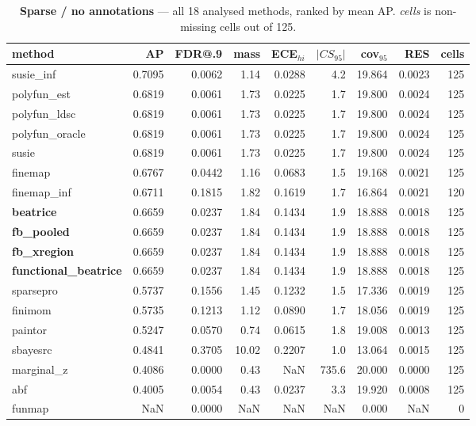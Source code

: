 \begin{table}[htbp]\centering\small
\caption{\textbf{Sparse / no annotations} --- all 18 analysed methods, ranked by mean AP. \emph{cells} is non-missing cells out of 125.}
\label{tab:main-sparse-none}
\begin{tabular}{lrrrrrrr r}\toprule
method & AP & FDR@.9 & mass & ECE$_{hi}$ & $|CS_{95}|$ & cov$_{95}$ & RES & cells\\\midrule
susie\_inf & 0.7095 & 0.0062 & 1.14 & 0.0288 & 4.2 & 19.864 & 0.0023 & 125\\
polyfun\_est & 0.6819 & 0.0061 & 1.73 & 0.0225 & 1.7 & 19.800 & 0.0024 & 125\\
polyfun\_ldsc & 0.6819 & 0.0061 & 1.73 & 0.0225 & 1.7 & 19.800 & 0.0024 & 125\\
polyfun\_oracle & 0.6819 & 0.0061 & 1.73 & 0.0225 & 1.7 & 19.800 & 0.0024 & 125\\
susie & 0.6819 & 0.0061 & 1.73 & 0.0225 & 1.7 & 19.800 & 0.0024 & 125\\
finemap & 0.6767 & 0.0442 & 1.16 & 0.0683 & 1.5 & 19.168 & 0.0021 & 125\\
finemap\_inf & 0.6711 & 0.1815 & 1.82 & 0.1619 & 1.7 & 16.864 & 0.0021 & 120\\
\textbf{beatrice} & 0.6659 & 0.0237 & 1.84 & 0.1434 & 1.9 & 18.888 & 0.0018 & 125\\
\textbf{fb\_pooled} & 0.6659 & 0.0237 & 1.84 & 0.1434 & 1.9 & 18.888 & 0.0018 & 125\\
\textbf{fb\_xregion} & 0.6659 & 0.0237 & 1.84 & 0.1434 & 1.9 & 18.888 & 0.0018 & 125\\
\textbf{functional\_beatrice} & 0.6659 & 0.0237 & 1.84 & 0.1434 & 1.9 & 18.888 & 0.0018 & 125\\
sparsepro & 0.5737 & 0.1556 & 1.45 & 0.1232 & 1.5 & 17.336 & 0.0019 & 125\\
finimom & 0.5735 & 0.1213 & 1.12 & 0.0890 & 1.7 & 18.056 & 0.0019 & 125\\
paintor & 0.5247 & 0.0570 & 0.74 & 0.0615 & 1.8 & 19.008 & 0.0013 & 125\\
sbayesrc & 0.4841 & 0.3705 & 10.02 & 0.2207 & 1.0 & 13.064 & 0.0015 & 125\\
marginal\_z & 0.4086 & 0.0000 & 0.43 & NaN & 735.6 & 20.000 & 0.0000 & 125\\
abf & 0.4005 & 0.0054 & 0.43 & 0.0237 & 3.3 & 19.920 & 0.0008 & 125\\
funmap & NaN & 0.0000 & NaN & NaN & NaN & 0.000 & NaN & 0\\
\bottomrule\end{tabular}\end{table}
